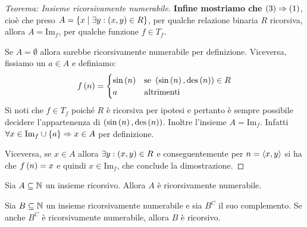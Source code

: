 \documentclass{lectures}
\begin{document}
\begin{multicols}{2}
\begin{proof}[Teorema: Insieme ricorsivamente numerabile]
    \textbf{Infine mostriamo che \(\left(3\right)\Rightarrow\left(1\right)\)}, cioè che preso \(A = \left\{x \mid \exists y: \left(x,y\right) \in R\right\}\), per qualche relazione binaria \(R\) ricorsiva, allora \(A = \text{Im}_f\), per qualche funzione \(f \in T_f\).
    
    Se \(A = \emptyset\) allora sarebbe ricorsivamente numerabile per definizione. Viceversa, fissiamo un \(a \in A\) e definiamo:
    \[
        f\left(n\right) = \begin{cases}
            \text{sin}\left(n\right) & \text{se } \left(\text{sin}\left(n\right), \text{des}\left(n\right)\right) \in R\\
            a & \text{altrimenti}
        \end{cases}
    \]
    Si noti che \(f \in T_f\) poiché \(R\) è ricorsiva per ipotesi e pertanto è sempre possibile decidere l'appartenenza di \(\left(\text{sin}\left(n\right), \text{des}\left(n\right)\right)\). Inoltre l'insieme \(A = \text{Im}_f\). Infatti \(\forall x \in \text{Im}_f \cup \left\{a\right\} \Rightarrow x \in A\) per definizione.
    
    Viceversa, se \(x \in A\) allora \(\exists y: \left(x,y\right) \in R\) e conseguentemente per \(n = \left\langle x,y\right\rangle\) si ha che \(f\left(n\right) = x\) e quindi \(x \in \text{Im}_f\), che conclude la dimostrazione.
\end{proof}
    \begin{theorem}
        Sia \(A \subseteq \mathbb{N}\) un insieme ricorsivo. Allora \(A\) è ricorsivamente numerabile.
    \end{theorem}
    \begin{theorem}
        Sia \(B \subseteq \mathbb{N}\) un insieme ricorsivamente numerabile e sia \(B^C\) il suo complemento. Se anche \(B^C\) è ricorsivamente numerabile, allora \(B\) è ricorsivo.
    \end{theorem}
\end{multicols}
\end{document}
